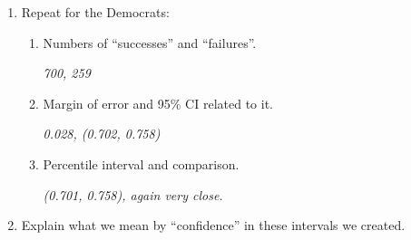\begin{enumerate}
\begin{enumerate}
\begin{enumerate}
\begin{key}
  {\em 0.016}
\end{key}
      \item Find the ``margin of error'' for a 95\% Confidence
        interval and write down the interval.

\begin{students}
\vspace{.8cm}
\end{students}

\begin{key}
  {\em ME = 0.032, 95\% CI: 0.27$\pm 0.032 = (0.38, 0.302)$}
\end{key}
  \item Compare that interval to one you get by clicking the
    appropriate button in the app.

\begin{students}
\vspace{.8cm}
\end{students}

\begin{key}
  {\em almost identical: ( 0.237 , 0.303 )}
\end{key}
      \end{enumerate}
    \item Repeat for the Democrats:
      \begin{enumerate}
      \item Numbers of ``successes'' and ``failures''.
\begin{students}
\vspace{.8cm}
\end{students}

\begin{key}
  {\em 700, 259 }
\end{key}
      \item Margin of error and 95\% CI related to it.
\begin{students}
\vspace{.8cm}
\end{students}

\begin{key}
  {\em 0.028, (0.702, 0.758)}
\end{key}
      \item Percentile interval and comparison.
\begin{students}
\vspace{.8cm}
\end{students}

\begin{key}
  {\em (0.701, 0.758), again very close. }
\end{key}
      \end{enumerate}
    \item Explain what we mean by ``confidence'' in these intervals we
      created.
\begin{students}
\vspace{4.8cm}
\end{students}


\end{enumerate}
\end{enumerate}
